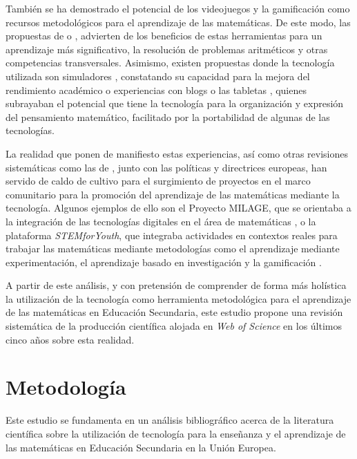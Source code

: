 \documentclass[spanish]{textolivre}
\begin{document}
También se ha demostrado el potencial de los videojuegos y la gamificación como recursos metodológicos para el aprendizaje de las matemáticas. De este modo, las propuestas de \textcite{kim_effects_2017,molina__resolucion_2020} o \textcite{pellas_systematic_2021}, advierten de los beneficios de estas herramientas para un aprendizaje más significativo, la resolución de problemas aritméticos y otras competencias transversales. Asimismo, existen propuestas donde la tecnología utilizada son simuladores \cite{diaz__aprendizaje_2018}, constatando su capacidad para la mejora del rendimiento académico o experiencias con blogs \cite{sanchez_uso_2016} o las tabletas \cite{guillen-gamez_digital_2018}, quienes subrayaban el potencial que tiene la tecnología para la organización y expresión del pensamiento matemático, facilitado por la portabilidad de algunas de las tecnologías.

La realidad que ponen de manifiesto estas experiencias, así como otras revisiones sistemáticas como las de \textcite{bano_mobile_2018}, junto con las políticas y directrices europeas, han servido de caldo de cultivo para el surgimiento de proyectos en el marco comunitario para la promoción del aprendizaje de las matemáticas mediante la tecnología. Algunos ejemplos de ello son el Proyecto MILAGE, que se orientaba a la integración de las tecnologías digitales en el área de matemáticas \cite{gonzales_integracion_2017}, o la plataforma \textit{STEMforYouth}, que integraba actividades en contextos reales para trabajar las matemáticas mediante metodologías como el aprendizaje mediante experimentación, el aprendizaje basado en investigación y la gamificación \cite{diego-mantecon_problemas_2018}.

A partir de este análisis, y con pretensión de comprender de forma más holística la utilización de la tecnología como herramienta metodológica para el aprendizaje de las matemáticas en Educación Secundaria, este estudio propone una revisión sistemática de la producción científica alojada en \textit{Web of Science} en los últimos cinco años sobre esta realidad.

\section{Metodología}

Este estudio se fundamenta en un análisis bibliográfico acerca de la literatura científica sobre la utilización de tecnología para la enseñanza y el aprendizaje de las matemáticas en Educación Secundaria en la Unión Europea.
\end{document}
